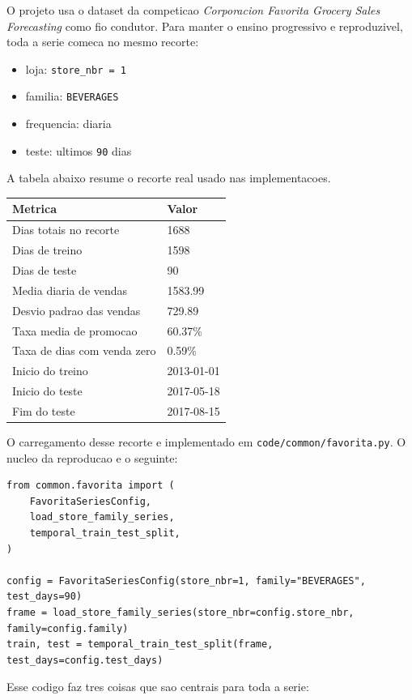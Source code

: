 \documentclass[12pt]{article}
\providecommand{\tightlist}{%
          \setlength{\itemsep}{0pt}\setlength{\parskip}{0pt}}
\begin{document}
O projeto usa o dataset da competicao \emph{Corporacion Favorita Grocery Sales Forecasting} como fio condutor. Para manter o ensino progressivo e reproduzivel, toda a serie comeca no mesmo recorte:

\begin{itemize}
\tightlist
\item
  loja: \texttt{store\_nbr\ =\ 1}
\item
  familia: \texttt{BEVERAGES}
\item
  frequencia: diaria
\item
  teste: ultimos \texttt{90} dias
\end{itemize}

A tabela abaixo resume o recorte real usado nas implementacoes.

\begin{longtable}[]{@{}ll@{}}
\toprule\noalign{}
Metrica & Valor \\
\midrule\noalign{}
\endhead
\bottomrule\noalign{}
\endlastfoot
Dias totais no recorte & 1688 \\
Dias de treino & 1598 \\
Dias de teste & 90 \\
Media diaria de vendas & 1583.99 \\
Desvio padrao das vendas & 729.89 \\
Taxa media de promocao & 60.37\% \\
Taxa de dias com venda zero & 0.59\% \\
Inicio do treino & 2013-01-01 \\
Inicio do teste & 2017-05-18 \\
Fim do teste & 2017-08-15 \\
\end{longtable}

O carregamento desse recorte e implementado em \texttt{code/common/favorita.py}. O nucleo da reproducao e o seguinte:

\begin{verbatim}
from common.favorita import (
    FavoritaSeriesConfig,
    load_store_family_series,
    temporal_train_test_split,
)

config = FavoritaSeriesConfig(store_nbr=1, family="BEVERAGES", test_days=90)
frame = load_store_family_series(store_nbr=config.store_nbr, family=config.family)
train, test = temporal_train_test_split(frame, test_days=config.test_days)
\end{verbatim}

Esse codigo faz tres coisas que sao centrais para toda a serie:
\end{document}
